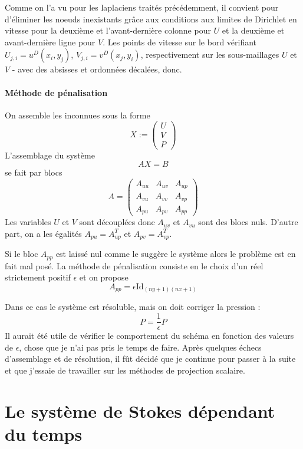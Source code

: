 Comme on l'a vu pour les laplaciens traités précédemment, il convient pour d'éliminer les noeuds inexistants grâce aux conditions aux limites de Dirichlet en vitesse pour la deuxième et l'avant-dernière colonne pour $U$ et la deuxième et avant-dernière ligne pour $V$. Les points de vitesse sur le bord vérifiant $U_{j,i} = u^D(x_i, y_j)$, $V_{j,i} = v^D(x_j, y_i)$, respectivement sur les sous-maillages $U$ et $V$ - avec des absisses et ordonnées décalées, donc.

\paragraph{Méthode de pénalisation} On assemble les inconnues sous la forme $$ X := \begin{pmatrix} U \\ V \\ P \end{pmatrix} $$ L'assemblage du système $$ A X = B $$ se fait par blocs $$ A = \begin{pmatrix} A_{uu} & A_{uv} & A_{up} \\ A_{vu} & A_{vv} & A_{vp} \\ A_{pu} & A_{pv} & A_{pp} \end{pmatrix} $$ Les variables $U$ et $V$ sont découplées donc $A_{uv}$ et $A_{vu}$ sont des blocs nuls. D'autre part, on a les égalités $A_{pu} = A_{up}^T$ et $A_{pv} = A_{vp}^T$.

Si le bloc $A_{pp}$ est laissé nul comme le suggère le système alors le problème est en fait mal posé. La méthode de pénalisation consiste en le choix d'un réel strictement positif $\epsilon$ et on propose $$ A_{pp} = \epsilon \text{Id}_{(ny+1)(nx+1)} $$

Dans ce cas le système est résoluble, mais on doit corriger la pression : $$ P = \frac{1}{\epsilon} P $$ Il aurait été utile de vérifier le comportement du schéma en fonction des valeurs de $\epsilon$, chose que je n'ai pas pris le temps de faire. Après quelques échecs d'assemblage et de résolution, il fût décidé que je continue pour passer à la suite et que j'essaie de travailler sur les méthodes de projection scalaire.

\section{Le système de Stokes dépendant du temps}

